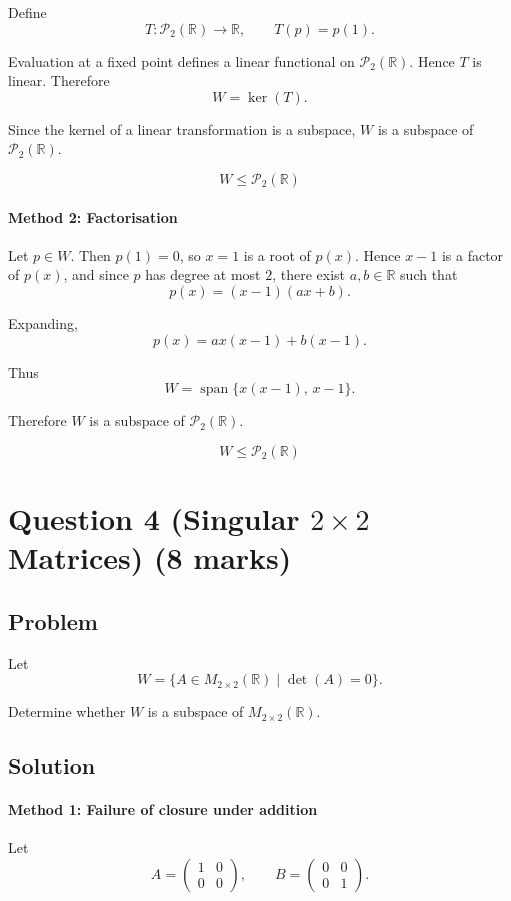 \documentclass[12pt]{article}
\newcommand{\Span}{\operatorname{span}}
\begin{document}
Define
\[
T:\mathcal P_2(\mathbb R)\to\mathbb R,\qquad T(p)=p(1).
\]

Evaluation at a fixed point defines a linear functional on \(\mathcal P_2(\mathbb R)\). Hence \(T\) is linear. Therefore
\[
W=\ker(T).
\]

Since the kernel of a linear transformation is a subspace, \(W\) is a subspace of \(\mathcal P_2(\mathbb R)\).

\[
\boxed{W\le \mathcal P_2(\mathbb R)}
\]

\paragraph{Method 2: Factorisation}

Let \(p\in W\). Then \(p(1)=0\), so \(x=1\) is a root of \(p(x)\). Hence \(x-1\) is a factor of \(p(x)\), and since \(p\) has degree at most \(2\), there exist \(a,b\in\mathbb R\) such that
\[
p(x)=(x-1)(ax+b).
\]

Expanding,
\[
p(x)=a x(x-1)+b(x-1).
\]

Thus
\[
W=\Span\{x(x-1),\,x-1\}.
\]

Therefore \(W\) is a subspace of \(\mathcal P_2(\mathbb R)\).

\[
\boxed{W\le \mathcal P_2(\mathbb R)}
\]

\newpage
\section{Question 4 (Singular \(2\times2\) Matrices) \hfill (8 marks)}
\subsection{Problem}

Let
\[
W=\{A\in M_{2\times2}(\mathbb R)\mid \det(A)=0\}.
\]

Determine whether \(W\) is a subspace of \(M_{2\times2}(\mathbb R)\).

\subsection{Solution}

\paragraph{Method 1: Failure of closure under addition}

Let
\[
A=\begin{pmatrix}1&0\\0&0\end{pmatrix},
\qquad
B=\begin{pmatrix}0&0\\0&1\end{pmatrix}.
\]
\end{document}
